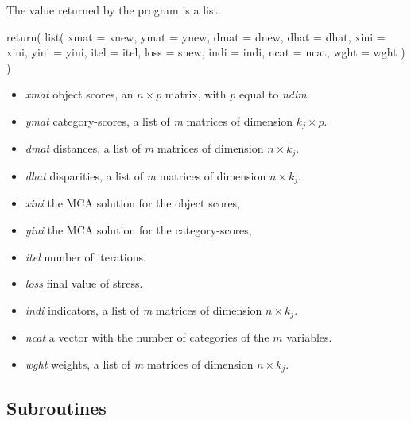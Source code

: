 \documentclass[
  12pt,
  letterpaper,
  DIV=11,
  numbers=noendperiod]{scrartcl}
\newenvironment{Shaded}{\begin{snugshade}}{\end{snugshade}}
\newcommand{\AttributeTok}[1]{\textcolor[rgb]{0.40,0.45,0.13}{#1}}
\newcommand{\FunctionTok}[1]{\textcolor[rgb]{0.28,0.35,0.67}{#1}}
\newcommand{\NormalTok}[1]{\textcolor[rgb]{0.00,0.23,0.31}{#1}}
\providecommand{\tightlist}{%
  \setlength{\itemsep}{0pt}\setlength{\parskip}{0pt}}
\begin{document}
The value returned by the program is a list.

\begin{Shaded}
\begin{Highlighting}[]
  \FunctionTok{return}\NormalTok{(}
    \FunctionTok{list}\NormalTok{(}
      \AttributeTok{xmat =}\NormalTok{ xnew,}
      \AttributeTok{ymat =}\NormalTok{ ynew,}
      \AttributeTok{dmat =}\NormalTok{ dnew,}
      \AttributeTok{dhat =}\NormalTok{ dhat,}
      \AttributeTok{xini =}\NormalTok{ xini,}
      \AttributeTok{yini =}\NormalTok{ yini,}
      \AttributeTok{itel =}\NormalTok{ itel,}
      \AttributeTok{loss =}\NormalTok{ snew,}
      \AttributeTok{indi =}\NormalTok{ indi,}
      \AttributeTok{ncat =}\NormalTok{ ncat,}
      \AttributeTok{wght =}\NormalTok{ wght}
\NormalTok{    )}
\NormalTok{  )}
\end{Highlighting}
\end{Shaded}

\begin{itemize}
\tightlist
\item
  \emph{xmat} object scores, an \(n \times p\) matrix, with \(p\) equal
  to \emph{ndim}.
\item
  \emph{ymat} category-scores, a list of \emph{m} matrices of dimension
  \(k_j \times p\).
\item
  \emph{dmat} distances, a list of \emph{m} matrices of dimension
  \(n \times k_j\).
\item
  \emph{dhat} disparities, a list of \emph{m} matrices of dimension
  \(n \times k_j\).
\item
  \emph{xini} the MCA solution for the object scores,
\item
  \emph{yini} the MCA solution for the category-scores,
\item
  \emph{itel} number of iterations.
\item
  \emph{loss} final value of stress.
\item
  \emph{indi} indicators, a list of \emph{m} matrices of dimension
  \(n \times k_j\).
\item
  \emph{ncat} a vector with the number of categories of the \(m\)
  variables.
\item
  \emph{wght} weights, a list of \emph{m} matrices of dimension
  \(n \times k_j\).
\end{itemize}

\subsection{Subroutines}\label{subroutines}
\end{document}
